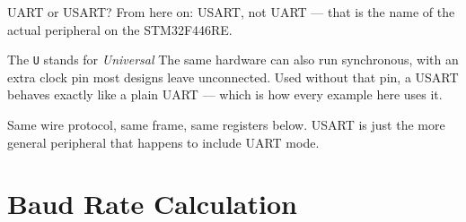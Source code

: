 \documentclass[9pt,aspectratio=169,xcolor=table]{beamer}
\begin{document}
\begin{frame}{UART or USART?}
    \leavevmode
    From here on: \alert{USART}, not UART --- that is the name of the actual
    peripheral on the STM32F446RE.

    \vspace{3mm}
    \begin{block}{The \texttt{U} stands for \emph{Universal}}
        The same hardware can also run \alert{synchronous}, with an extra clock
        pin most designs leave unconnected. Used without that pin, a USART
        behaves exactly like a plain UART --- which is how every example here
        uses it.
    \end{block}

    \vspace{2mm}
    {\small Same wire protocol, same frame, same registers below. USART is just
    the more general peripheral that happens to include UART mode.}
\end{frame}


\section{Baud Rate Calculation}
\end{document}
